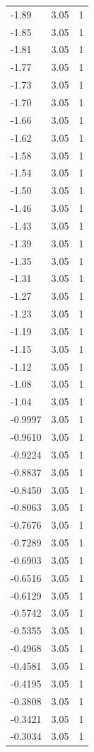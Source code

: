 \begin{longtable}{lrr}
  -1.89 & 3.05 & 1 \\
  -1.85 & 3.05 & 1 \\
  -1.81 & 3.05 & 1 \\
  -1.77 & 3.05 & 1 \\
  -1.73 & 3.05 & 1 \\
  -1.70 & 3.05 & 1 \\
  -1.66 & 3.05 & 1 \\
  -1.62 & 3.05 & 1 \\
  -1.58 & 3.05 & 1 \\
  -1.54 & 3.05 & 1 \\
  -1.50 & 3.05 & 1 \\
  -1.46 & 3.05 & 1 \\
  -1.43 & 3.05 & 1 \\
  -1.39 & 3.05 & 1 \\
  -1.35 & 3.05 & 1 \\
  -1.31 & 3.05 & 1 \\
  -1.27 & 3.05 & 1 \\
  -1.23 & 3.05 & 1 \\
  -1.19 & 3.05 & 1 \\
  -1.15 & 3.05 & 1 \\
  -1.12 & 3.05 & 1 \\
  -1.08 & 3.05 & 1 \\
  -1.04 & 3.05 & 1 \\
  -0.9997 & 3.05 & 1 \\
  -0.9610 & 3.05 & 1 \\
  -0.9224 & 3.05 & 1 \\
  -0.8837 & 3.05 & 1 \\
  -0.8450 & 3.05 & 1 \\
  -0.8063 & 3.05 & 1 \\
  -0.7676 & 3.05 & 1 \\
  -0.7289 & 3.05 & 1 \\
  -0.6903 & 3.05 & 1 \\
  -0.6516 & 3.05 & 1 \\
  -0.6129 & 3.05 & 1 \\
  -0.5742 & 3.05 & 1 \\
  -0.5355 & 3.05 & 1 \\
  -0.4968 & 3.05 & 1 \\
  -0.4581 & 3.05 & 1 \\
  -0.4195 & 3.05 & 1 \\
  -0.3808 & 3.05 & 1 \\
  -0.3421 & 3.05 & 1 \\
  -0.3034 & 3.05 & 1 \\

\end{longtable}
